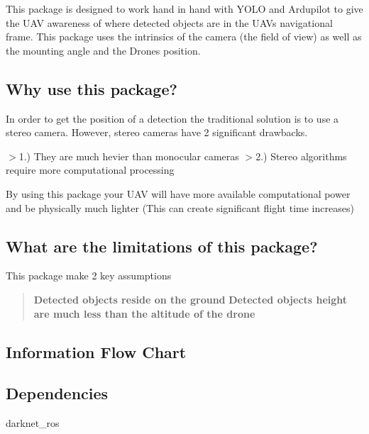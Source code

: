 This package is designed to work hand in hand with Y\+O\+LO and Ardupilot to give the U\+AV awareness of where detected objects are in the U\+AV\textquotesingle{}s navigational frame. This package uses the intrinsics of the camera (the field of view) as well as the mounting angle and the Drone\textquotesingle{}s position.

\subsection*{Why use this package?}

In order to get the position of a detection the traditional solution is to use a stereo camera. However, stereo cameras have 2 significant drawbacks.

$>$1.) They are much hevier than monocular cameras $>$2.) Stereo algorithms require more computational processing

By using this package your U\+AV will have more available computational power and be physically much lighter (This can create significant flight time increases)

\subsection*{What are the limitations of this package?}

This package make 2 key assumptions \begin{quote}
{\bfseries{Detected objects reside on the ground}} {\bfseries{Detected object\textquotesingle{}s height are much less than the altitude of the drone}} \end{quote}


\subsection*{Information Flow Chart}

\subsection*{Dependencies}


\begin{DoxyItemize}
\item darknet\+\_\+ros
\end{DoxyItemize}


\begin{DoxyCode}{0}
\end{DoxyCode}
